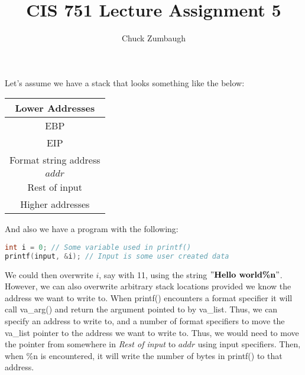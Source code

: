 \documentclass[12pt]{article}
\author{Chuck Zumbaugh}
\title{CIS 751 Lecture Assignment 5}
\begin{document}
\maketitle

Let's assume we have a stack that looks something like the below:
\bigbreak
\begin{tabular}{|c|}
\hline
Lower Addresses \\
\hline
EBP \\
\hline
EIP \\
\hline
Format string address \\
\hline
$addr$ \\
\hline
Rest of input \\
\hline
Higher addresses \\
\hline
\end{tabular}
\bigbreak

And also we have a program with the following:

\begin{lstlisting}[language=c]
int i = 0; // Some variable used in printf()
printf(input, &i); // Input is some user created data
\end{lstlisting}

We could then overwrite $i$, say with 11, using the string $"\textbf{Hello world\%n}"$. However, we can also overwrite arbitrary stack locations provided we know the address we want to write to. When printf() encounters a format specifier it will call va\_arg() and return the argument pointed to by va\_list. Thus, we can specify an address to write to, and a number of format specifiers to move the va\_list pointer to the address we want to write to. Thus, we would need to move the pointer from somewhere in \textit{Rest of input} to $addr$ using input specifiers. Then, when \%n is encountered, it will write the number of bytes in printf() to that address.
\end{document}
